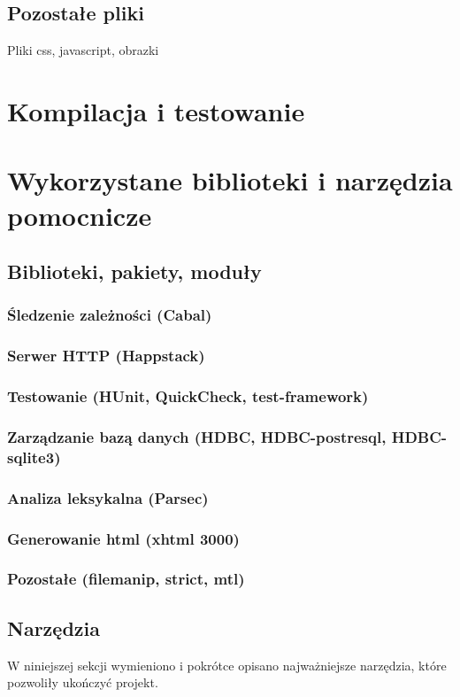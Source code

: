 \documentclass[10pt,leqno]{article}
\begin{document}
\subsection{Pozostałe pliki}
Pliki css, javascript, obrazki

\section{Kompilacja i testowanie}

\section{Wykorzystane biblioteki i narzędzia pomocnicze}
\subsection{Biblioteki, pakiety, moduły}
\subsubsection{Śledzenie zależności (Cabal)}
\subsubsection{Serwer HTTP (Happstack)}
\subsubsection{Testowanie (HUnit, QuickCheck, test-framework)}
\subsubsection{Zarządzanie bazą danych (HDBC, HDBC-postresql, HDBC-sqlite3)}
\subsubsection{Analiza leksykalna (Parsec)}
\subsubsection{Generowanie html (xhtml 3000)}
\subsubsection{Pozostałe (filemanip, strict, mtl)}

\subsection{Narzędzia}
W niniejszej sekcji wymieniono i pokrótce opisano najważniejsze narzędzia, które pozwoliły ukończyć projekt.
\end{document}
